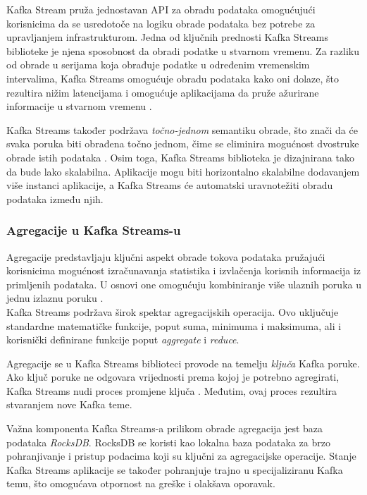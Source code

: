 \documentclass[times, utf8, diplomski]{fer}
\begin{document}
Kafka Stream pruža jednostavan API za obradu podataka omogućujući korisnicima da se usredotoče na logiku obrade podataka bez potrebe za upravljanjem infrastrukturom. Jedna od ključnih prednosti Kafka Streams biblioteke je njena sposobnost da obradi podatke u stvarnom vremenu. 
Za razliku od obrade u serijama  koja obrađuje podatke u određenim vremenskim intervalima, Kafka Streams omogućuje obradu podataka kako oni dolaze, što rezultira nižim latencijama i omogućuje aplikacijama da pruže ažurirane informacije u stvarnom vremenu \citep{seymour_mastering_2021}.

Kafka Streams također podržava \emph{\glqq točno-jednom\grqq} semantiku obrade, što znači da će svaka poruka biti obrađena točno jednom, čime se eliminira mogućnost dvostruke obrade istih podataka \citep{narkhede_exactly-once_2017}.
Osim toga, Kafka Streams biblioteka je dizajnirana tako da bude lako skalabilna. Aplikacije mogu biti horizontalno skalabilne dodavanjem više instanci aplikacije, a Kafka Streams će automatski uravnotežiti obradu podataka između njih.

\subsubsection{Agregacije u Kafka Streams-u}

Agregacije predstavljaju ključni aspekt obrade tokova podataka pružajući korisnicima mogućnost izračunavanja statistika i izvlačenja korisnih informacija iz primljenih podataka. U osnovi one omogućuju kombiniranje više ulaznih poruka u jednu izlaznu poruku \citep{seymour_mastering_2021}.\\

Kafka Streams podržava širok spektar agregacijskih operacija. Ovo uključuje standardne matematičke funkcije, poput suma, minimuma i maksimuma, ali i korisnički definirane funkcije poput \emph{aggregate} i \emph{reduce}.

Agregacije se u Kafka Streams biblioteci provode na temelju \emph{ključa} Kafka poruke. Ako ključ poruke ne odgovara vrijednosti prema kojoj je potrebno agregirati, Kafka Streams nudi proces promjene ključa . Međutim, ovaj proces rezultira stvaranjem nove Kafka teme.

Važna komponenta Kafka Streams-a prilikom obrade agregacija jest baza podataka \emph{RocksDB}. RocksDB se koristi kao lokalna baza podataka za brzo pohranjivanje i pristup podacima koji su ključni za agregacijske operacije. Stanje Kafka Streams aplikacije se također pohranjuje trajno u specijaliziranu Kafka temu, što omogućava otpornost na greške i olakšava oporavak.\\
\end{document}
